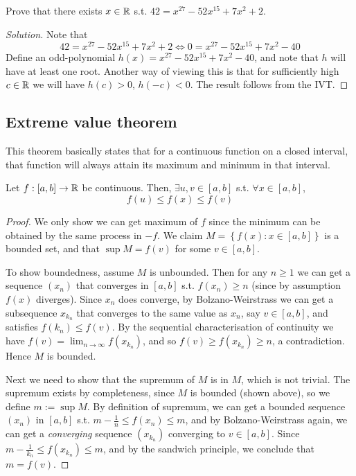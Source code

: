 \begin{example}
Prove that there exists $x\in\mathbb R$ s.t. $42=x^{27}-52x^{15}+7x^2+2$.
\end{example}
\begin{proof}[Solution]
  Note that 
  \[42=x^{27}-52x^{15}+7x^2+2 \iff 0=x^{27}-52x^{15}+7x^2-40\]
  Define an odd-polynomial $h(x)=x^{27}-52x^{15}+7x^2-40$, and note that $h$ will have at
  least one root. Another way of viewing this is that for sufficiently high $c\in\mathbb R$ we
  will have $h(c)>0$, $h(-c)<0$. The result follows from the IVT.
\end{proof}

\subsection{Extreme value theorem}
This theorem basically states that for a continuous function on a closed interval, that
function will always attain its maximum and minimum in that interval. 
\begin{theorem}
  Let $f:[a,b]\to\mathbb R$ be continuous. Then, $\exists u,v\in [a,b]$ s.t. $\forall
  x\in[a,b]$,
  \[f(u)\leq f(x)\leq f(v)\]

  \label{evt}
\end{theorem}
\begin{proof}
  We only show we can get maximum of $f$ since the minimum can be obtained by the same
  process in $-f$. We claim $M=\left\{ f(x) : x\in [a,b] \right\}$ is a bounded set, and
  that $\sup M=f(v)$ for some $v\in [a,b]$.
  
  To show boundedness, assume $M$ is unbounded. Then for any $n\geq 1$ we can get a
  sequence $(x_n)$ that converges in $[a,b]$ s.t. $f(x_n)\geq n$ (since by assumption
  $f(x)$ diverges). Since $x_n$ does converge, by Bolzano-Weirstrass we can get a
  subsequence $x_{k_n}$ that converges to the same value as $x_n$, say $v\in [a,b]$, and
  satisfies $f(k_n)\leq f(v)$. By the sequential characterisation of continuity we have
  $f(v)=\lim_{n\to\infty} f(x_{k_n})$, and so $f(v)\geq f(x_{k_n})\geq n$, a
  contradiction. Hence $M$ is bounded. 

  Next we need to show that the supremum of $M$ is in $M$, which is not trivial. The
  supremum exists by completeness, since $M$ is bounded (shown above), so we define
  $m:=\sup M$. By definition of supremum, we can get a bounded sequence $(x_n)$ in
  $[a,b]$ s.t. $m-\frac{1}{n}\leq f(x_n)\leq m$, and by Bolzano-Weirstrass again, we can
  get a \emph{converging} sequence $(x_{k_n})$ converging to $v\in[a,b]$. Since
  $m-\frac{1}{k_n} \leq f(x_{k_n}) \leq m$, and by the sandwich principle, we conclude
  that $m=f(v)$.
\end{proof}

